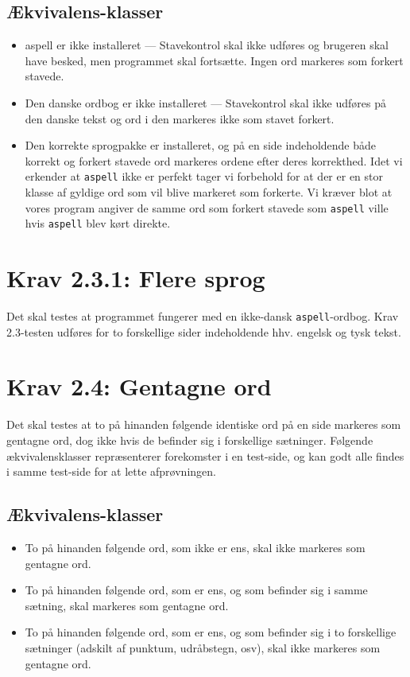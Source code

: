 \documentclass[a4paper,oneside,article, titlepage]{memoir}
\begin{document}
\subsection{Ækvivalens-klasser}
\begin{itemize}
\item aspell er ikke installeret --- Stavekontrol skal ikke udføres og
  brugeren skal have besked, men programmet skal fortsætte. Ingen ord
  markeres som forkert stavede.
\item Den danske ordbog er ikke installeret --- Stavekontrol skal ikke
  udføres på den danske tekst og ord i den markeres ikke som stavet
  forkert.
\item Den korrekte sprogpakke er installeret, og på en side
  indeholdende både korrekt og forkert stavede ord markeres ordene
  efter deres korrekthed. Idet vi erkender at \texttt{aspell} ikke er
  perfekt tager vi forbehold for at der er en stor klasse af gyldige
  ord som vil blive markeret som forkerte. Vi kræver blot at vores
  program angiver de samme ord som forkert stavede som \texttt{aspell}
  ville hvis \texttt{aspell} blev kørt direkte.
\end{itemize}

\section*{Krav 2.3.1: Flere sprog}

Det skal testes at programmet fungerer med en ikke-dansk
\texttt{aspell}-ordbog. Krav 2.3-testen udføres for to forskellige
sider indeholdende hhv. engelsk og tysk tekst.

\section*{Krav 2.4: Gentagne ord}

Det skal testes at to på hinanden følgende identiske ord på en side
markeres som gentagne ord, dog ikke hvis de befinder sig i forskellige
sætninger. Følgende ækvivalensklasser repræsenterer forekomster i en
test-side, og kan godt alle findes i samme test-side for at lette
afprøvningen.

\subsection{Ækvivalens-klasser}
\begin{itemize}
\item To på hinanden følgende ord, som ikke er ens, skal ikke
  markeres som gentagne ord.
\item To på hinanden følgende ord, som er ens, og som befinder sig i
  samme sætning, skal markeres som gentagne ord.
\item To på hinanden følgende ord, som er ens, og som befinder sig i
  to forskellige sætninger (adskilt af punktum, udråbstegn, osv), skal
  ikke markeres som gentagne ord.
\end{itemize}
\end{document}
